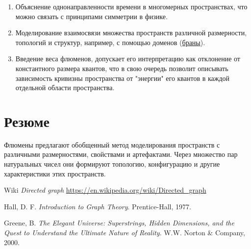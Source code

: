 \documentclass[final]{article}
\begin{document}
        \begin{enumerate}

            \item Объяснение однонаправленности времени в многомерных 
            пространствах, что можно связать с принципами симметрии в физике.

            \item Моделирование взаимосвязи множества пространств различной 
            размерности, топологий и структур, например, с помощью доменов 
            (\href{https://en.wikipedia.org/wiki/Brane}{браны}).

            \item Введение веса флюменов, допускает его интерпретацию как 
            отклонение от константного размера квантов, что в свою очередь 
            позволит описывать зависимость кривизны пространства от "энергии" 
            его квантов в каждой отдельной области пространства.

        \end{enumerate}

    \section{Резюме}

        Флюмены предлагают обобщенный метод моделирования пространств с 
        различными размерностями, свойствами и артефактами. Через множество пар 
        натуральных чисел они формируют топологию, конфигурацию и другие 
        характеристики этих пространств.

    \renewcommand{\refname}{Список литературы}
    \begin{thebibliography}{9}

         Wiki
        \textit{Directed graph}
        \url{https://en.wikipedia.org/wiki/Directed_graph}

         Hall, D. F. \textit{Introduction to Graph Theory}.
        Prentice-Hall, 1977.

         Greene, B. \textit{The Elegant Universe:
        Superstrings, Hidden Dimensions, and the Quest to Understand the
        Ultimate Nature of Reality}. W.W. Norton \& Company, 2000.

    \end{thebibliography}
\end{document}
